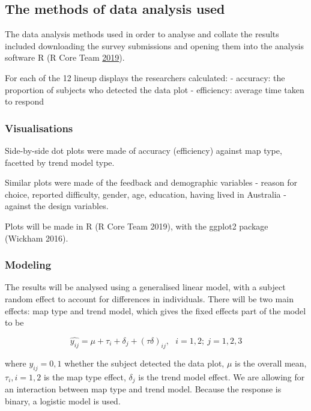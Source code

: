 \documentclass[conference,final,]{IEEEtran}
\begin{document}
\hypertarget{the-methods-of-data-analysis-used}{%
\subsection{The methods of data analysis
used}\label{the-methods-of-data-analysis-used}}

The data analysis methods used in order to analyse and collate the
results included downloading the survey submissions and opening them
into the analysis software R (R Core Team
\protect\hyperlink{ref-RCore}{2019}).

For each of the 12 lineup displays the researchers calculated: -
accuracy: the proportion of subjects who detected the data plot -
efficiency: average time taken to respond

\hypertarget{visualisations}{%
\subsubsection{Visualisations}\label{visualisations}}

Side-by-side dot plots were made of accuracy (efficiency) against map
type, facetted by trend model type.

Similar plots were made of the feedback and demographic variables -
reason for choice, reported difficulty, gender, age, education, having
lived in Australia - against the design variables.

Plots will be made in R (R Core Team 2019), with the ggplot2 package
(Wickham 2016).

\hypertarget{modeling}{%
\subsubsection{Modeling}\label{modeling}}

The results will be analysed using a generalised linear model, with a
subject random effect to account for differences in individuals. There
will be two main effects: map type and trend model, which gives the
fixed effects part of the model to be

\[\widehat{y_{ij}} = \mu + \tau_i + \delta_j + (\tau\delta)_{ij}, ~~~ i=1,2; ~j=1,2,3\]

where \(y_{ij} = 0, 1\) whether the subject detected the data plot,
\(\mu\) is the overall mean, \(\tau_i, i=1,2\) is the map type effect,
\(\delta_j\) is the trend model effect. We are allowing for an
interaction between map type and trend model. Because the response is
binary, a logistic model is used.
\end{document}
